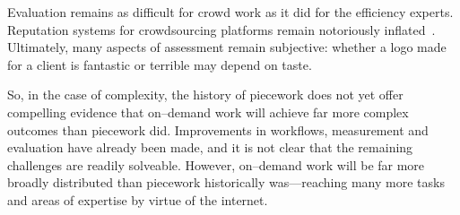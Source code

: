 \documentclass[trackingWork]{subfiles}
\begin{document}
Evaluation remains as difficult for crowd work as it did for the efficiency experts. 
Reputation systems for crowdsourcing platforms remain notoriously inflated~\cite{Horton2015a}.
Ultimately, many aspects of assessment remain subjective: whether a logo made for a client is fantastic or terrible may depend on taste.

So, in the case of complexity, the history of piecework does not yet offer compelling evidence that on--demand work will achieve far more complex outcomes than piecework did.
Improvements in workflows, measurement and evaluation have already been made, and it is not clear that the remaining challenges are readily solveable.
However, on--demand work will be far more broadly distributed than piecework historically was---reaching many more tasks and areas of expertise by virtue of the internet.




\end{document}
